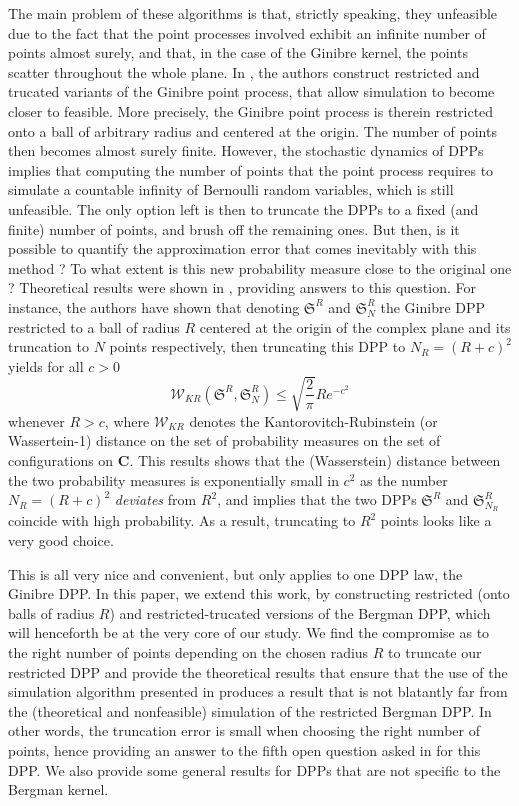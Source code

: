 \documentclass[11pt]{article}
\begin{document}
The main problem of these algorithms is that, strictly speaking, they unfeasible due to the fact that the point processes involved exhibit an infinite number of points almost surely, and that, in the case of the Ginibre kernel, the points scatter throughout the whole plane. In \cite{DecreusefondMoroz2021}, the authors construct restricted and trucated variants of the Ginibre point process, that allow simulation to become closer to feasible. More precisely, the Ginibre point process is therein restricted onto a ball of arbitrary radius and centered at the origin. The number of points then becomes almost surely finite. However, the stochastic dynamics of DPPs implies that computing the number of points that the point process requires to simulate a countable infinity of Bernoulli random variables, which is still unfeasible. The only option left is then to truncate the DPPs to a fixed (and finite) number of points, and brush off the remaining ones. But then, is it possible to quantify the approximation error that comes inevitably with this method ? To what extent is this new probability measure close
to the original one ? Theoretical results were shown in \cite{DecreusefondMoroz2021}, providing answers to this question. For instance, the authors have shown that denoting $\mathfrak S^R $ and $ \mathfrak S^R_N $ the Ginibre DPP restricted to a ball of radius $R$ centered at the origin of the complex plane and its truncation to $N$ points respectively, then truncating this DPP to $N_R = (R + c)^2 $ yields for all $ c > 0 $ \begin{equation} \mathcal W_{KR} (\mathfrak S^R, \mathfrak S^R_N ) \leqslant \sqrt{\frac 2 \pi } R e^{-c^2} \end{equation} whenever $ R > c$, where $ \mathcal W_{KR} $ 
denotes the Kantorovitch-Rubinstein (or Wassertein-1) distance on the set of probability measures on the set of configurations on $\mathbf C$. This results shows that the (Wasserstein) distance between the two probability measures is exponentially small in $c^2$ as the number $ N_R = (R+c)^2 $ \textit{deviates} from $ R^2 $, and implies that the two DPPs $ \mathfrak S^R $ and $ \mathfrak S^R_{N_R} $ coincide with high probability. As a result, truncating to $R^2$ points looks like a very good choice. 

This is all very nice and convenient, but only applies to one DPP law, the Ginibre DPP. In this paper, we extend this work, by constructing restricted (onto balls of radius $R$) and restricted-trucated versions of the Bergman DPP, which will henceforth be at the very core of our study. We find the compromise as to the right number of points depending on the chosen radius $R$ to truncate our restricted DPP and provide the theoretical results that ensure that the use of the simulation algorithm presented in \cite{DecreusefondMoroz2021} produces a result that is not blatantly far from the (theoretical and nonfeasible) simulation of the restricted Bergman DPP. In other words, the truncation error is small when choosing the right number of points, hence providing an answer to the fifth open question asked in \cite{Decreusefond2016} for this DPP. We also provide some general results for DPPs that are not specific to the Bergman kernel.
\end{document}
